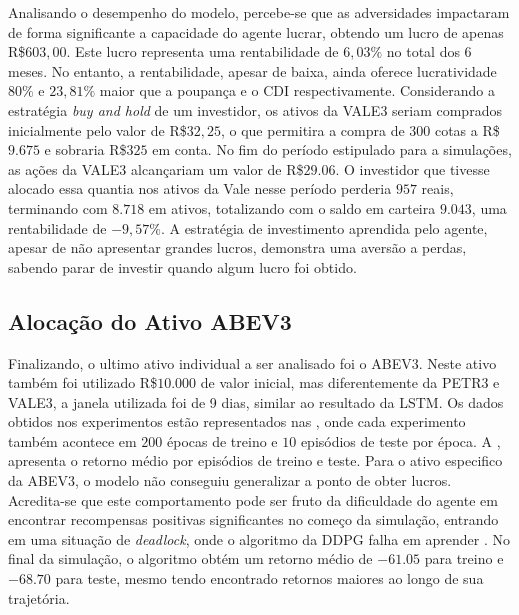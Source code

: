Analisando o desempenho do modelo, percebe-se que as adversidades impactaram de forma significante a capacidade do agente lucrar, obtendo um lucro de apenas R\$$603,00$. Este lucro representa uma rentabilidade de $6,03\%$ no total dos 6 meses. No entanto, a rentabilidade, apesar de baixa, ainda oferece lucratividade $80\%$ e $23,81\%$ maior que a poupança e o CDI respectivamente. Considerando a estratégia \emph{buy and hold} de um investidor, os ativos da VALE3 seriam comprados inicialmente pelo valor de R\$$32,25$, o que permitira a compra de $300$ cotas a R\$$9.675$ e sobraria R\$$325$ em conta. No fim do período estipulado para a simulações, as ações da VALE3 alcançariam um valor de R\$$29.06$. O investidor que tivesse alocado essa quantia nos ativos da Vale nesse período perderia $957$ reais, terminando com $8.718$ em ativos, totalizando com o saldo em carteira $9.043$, uma rentabilidade de $-9,57\%$. A estratégia de investimento aprendida pelo agente, apesar de não apresentar grandes lucros, demonstra uma aversão a perdas, sabendo parar de investir quando algum lucro foi obtido.


\subsection{Alocação do Ativo ABEV3}

Finalizando, o ultimo ativo individual a ser analisado foi o ABEV3. Neste ativo também foi utilizado R\$$10.000$ de valor inicial, mas diferentemente da PETR3 e VALE3, a janela utilizada foi de 9 dias, similar ao resultado da \acrshort{LSTM}. Os dados obtidos nos experimentos estão representados nas , onde cada experimento também acontece em $200$ épocas de treino e $10$ episódios de teste por época. A , apresenta o retorno médio por episódios de treino e teste. Para o ativo especifico da ABEV3, o modelo não conseguiu generalizar a ponto de obter lucros. Acredita-se que este comportamento pode ser fruto da dificuldade do agente em encontrar recompensas positivas significantes no começo da simulação, entrando em uma situação de \emph{deadlock}, onde o algoritmo da \acrshort{DDPG} falha em aprender \cite{}. No final da simulação, o algoritmo obtém um retorno médio de $-61.05$ para treino e $-68.70$ para teste, mesmo tendo encontrado retornos maiores ao longo de sua trajetória. 



